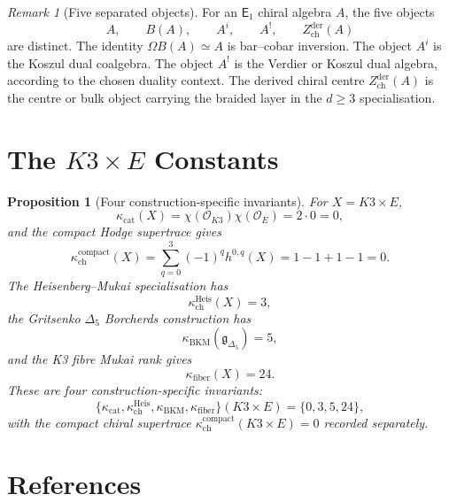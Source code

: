 \documentclass[11pt]{amsart}
\newtheorem{proposition}[theorem]{Proposition}
\theoremstyle{definition}
\theoremstyle{remark}
\newtheorem{remark}[theorem]{Remark}
\providecommand{\cO}{\mathcal{O}}
\providecommand{\Eone}{\mathsf{E}_1}
\providecommand{\kch}{\kappa_{\mathrm{ch}}}
\providecommand{\kcat}{\kappa_{\mathrm{cat}}}
\providecommand{\kBKM}{\kappa_{\mathrm{BKM}}}
\providecommand{\kfib}{\kappa_{\mathrm{fiber}}}
\providecommand{\Zchder}{Z^{\mathrm{der}}_{\mathrm{ch}}}
\begin{document}
\begin{remark}[Five separated objects]
\label{rem:five-objects}
For an $\Eone$ chiral algebra $A$, the five objects
\[
  A,\qquad B(A),\qquad A^i,\qquad A^!,\qquad \Zchder(A)
\]
are distinct.  The identity $\Omega B(A)\simeq A$ is bar--cobar
inversion.  The object $A^i$ is the Koszul dual coalgebra.  The object
$A^!$ is the Verdier or Koszul dual algebra, according to the chosen
duality context.  The derived chiral centre $\Zchder(A)$ is the centre
or bulk object carrying the braided layer in the $d\geq 3$ specialisation.
\end{remark}

\section{The $K3\times E$ Constants}

\begin{proposition}[Four construction-specific invariants]
\label{prop:k3e-values}
For $X=K3\times E$,
\[
  \kcat(X)=\chi(\cO_{K3})\chi(\cO_E)=2\cdot0=0,
\]
and the compact Hodge supertrace gives
\[
  \kch^{\mathrm{compact}}(X)
  =
  \sum_{q=0}^3(-1)^q h^{0,q}(X)
  =
  1-1+1-1
  =
  0.
\]
The Heisenberg--Mukai specialisation has
\[
  \kch^{\mathrm{Heis}}(X)=3,
\]
the Gritsenko $\Delta_5$ Borcherds construction has
\[
  \kBKM(\mathfrak g_{\Delta_5})=5,
\]
and the K3 fibre Mukai rank gives
\[
  \kfib(X)=24.
\]
These are four construction-specific invariants:
\[
  \{\kcat,\kch^{\mathrm{Heis}},\kBKM,\kfib\}(K3\times E)
  =
  \{0,3,5,24\},
\]
with the compact chiral supertrace
$\kch^{\mathrm{compact}}(K3\times E)=0$ recorded separately.
\end{proposition}

\section{References}
\end{document}
